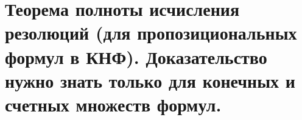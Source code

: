 \section{Теорема полноты исчисления резолюций (для пропозициональных формул в КНФ). Доказательство нужно знать только для конечных и счетных множеств формул.}